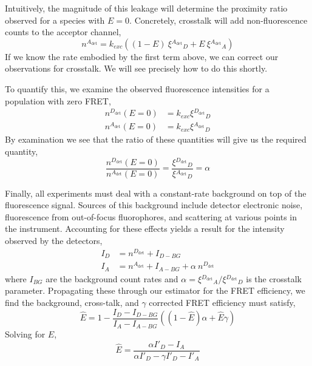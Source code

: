 \documentclass{article}
\newcommand{\dt}[1]{\ensuremath{^{#1_\mathrm{det}}}}   %
\begin{document}
Intuitively, the magnitude of this leakage will determine the
proximity ratio observed for a species with $E=0$. Concretely, crosstalk
will add non-fluorescence counts to the acceptor channel,
\begin{equation*}
  n\dt{A} = k_{exc} \left( (1-E)~\xi\dt{A}_D + E~\xi\dt{A}_A \right)
\end{equation*}
If we know the rate embodied by the first term above, we can correct
our observations for crosstalk. We will see precisely how to do this
shortly.

To quantify this,
we examine the observed fluorescence intensities for a population with
zero FRET,
\begin{align*}
  n\dt{D}(E=0) & = k_{exc} \xi\dt{D}_D \\
  n\dt{A}(E=0) & = k_{exc} \xi\dt{A}_D
\end{align*} 
By examination we see that the ratio of these quantities will give us
the required quantity,
\begin{equation*}
  \frac{n\dt{D}(E=0)}{n\dt{A}(E=0)} = \frac{\xi\dt{D}_D}{\xi\dt{A}_D} = \alpha
\end{equation*}

Finally, all experiments must deal with a constant-rate
background on top of the fluorescence signal. Sources of this background
include detector electronic noise, fluorescence from out-of-focus
fluorophores, and scattering at various points in the instrument.
Accounting for these effects yields a result for the intensity
observed by the detectors,
\begin{align*}
  I_D & = n\dt{D} + I_{D-BG} \\
  I_A & = n\dt{A} + I_{A-BG} + \alpha~n\dt{D}
\end{align*} 
where $I_{BG}$ are the background count rates and $\alpha =
\xi\dt{D}_A / \xi\dt{D}_D$ is the crosstalk parameter. Propagating
these through our estimator for the FRET efficiency, we find the
background, cross-talk, and $\gamma$ corrected FRET efficiency must
satisfy,
\begin{equation}
  \hat E = 1 - \frac{I_D - I_{D-BG}}{I_A - I_{A-BG}} \left( (1 - \hat E)\alpha + \hat E \gamma \right)
\end{equation}
Solving for $E$,
\begin{equation}
  \hat E = \frac{\alpha I'_D - I_A}{\alpha I'_D - \gamma I'_D - I'_A}
\end{equation}
\end{document}
